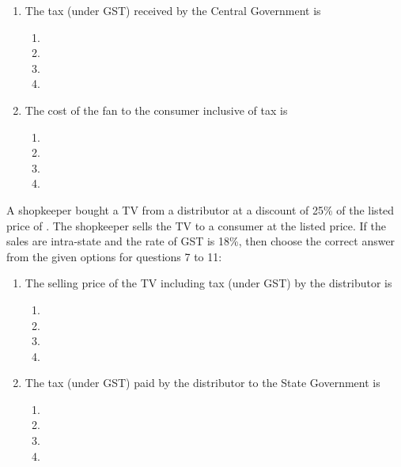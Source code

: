 \documentclass[12pt]{article}
\begin{document}
\begin{multicols}{2}
\begin{enumerate}[label=\textbf{\arabic*.}]
\item The tax (under GST) received by the Central Government is
\begin{enumerate}[label=(\alph*)]
\item {}
\item {}
\item {}
\item {}
\end{enumerate}

\item The cost of the fan to the consumer inclusive of tax is
\begin{enumerate}[label=(\alph*)]
\item {}
\item {}
\item {}
\item {}
\end{enumerate}
\end{enumerate}

A shopkeeper bought a TV from a distributor at a discount of 25\% of the listed price of . The shopkeeper sells the TV to a consumer at the listed price. If the sales are intra-state and the rate of GST is 18\%, then choose the correct answer from the given options for questions 7 to 11:

\begin{enumerate}[label=\textbf{\arabic*.},resume]
\item The selling price of the TV including tax (under GST) by the distributor is
\begin{enumerate}[label=(\alph*)]
\item {}
\item {}
\item {}
\item {}
\end{enumerate}

\item The tax (under GST) paid by the distributor to the State Government is
\begin{enumerate}[label=(\alph*)]
\item {}
\item {}
\item {}
\item {}
\end{enumerate}


\end{enumerate}
\end{multicols}
\end{document}
